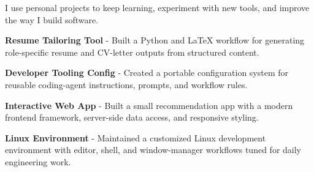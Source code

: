 

\begin{cventries}

  \cventry
  {}
  {}
  {}
  {}
  {
    \vspace{-10mm}
    \begin{cvitems}
      \item {I use personal projects to keep learning, experiment with new tools, and improve the way I build software.}
    \end{cvitems}
    \begin{cvsubitems}
      \item {\textbf{Resume Tailoring Tool} - Built a Python and LaTeX workflow for generating role-specific resume and CV-letter outputs from structured content.}
      \item {\textbf{Developer Tooling Config} - Created a portable configuration system for reusable coding-agent instructions, prompts, and workflow rules.}
      \item {\textbf{Interactive Web App} - Built a small recommendation app with a modern frontend framework, server-side data access, and responsive styling.}
      \item {\textbf{Linux Environment} - Maintained a customized Linux development environment with editor, shell, and window-manager workflows tuned for daily engineering work.}
    \end{cvsubitems}
  }
\end{cventries}
